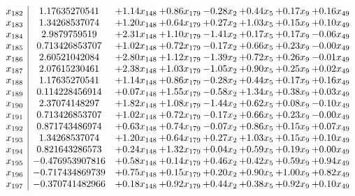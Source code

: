 \documentclass[8pt]{article}
\begin{document}
\[\begin{array}{c| c c@{\hskip 2pt} c@{\hskip 2pt} c@{\hskip 2pt} c@{\hskip 2pt} c@{\hskip 2pt} c@{\hskip 2pt} }
 x_{182}   &  1.17635270541 & +  1.14 x_{148} & +  0.86 x_{179} & -0.28 x_{2} & +  0.44 x_{5} & +  0.17 x_{9} & +  0.16 x_{49}\\
 x_{183}   &  1.34268537074 & +  1.20 x_{148} & +  0.64 x_{179} & +  0.27 x_{2} & +  1.03 x_{5} & +  0.15 x_{9} & +  0.10 x_{49}\\
 x_{184}   &  2.9879759519 & +  2.31 x_{148} & +  1.10 x_{179} & -1.41 x_{2} & +  0.17 x_{5} & +  0.17 x_{9} & -0.06 x_{49}\\
 x_{185}   &  0.713426853707 & +  1.02 x_{148} & +  0.72 x_{179} & -0.17 x_{2} & +  0.66 x_{5} & +  0.23 x_{9} & -0.00 x_{49}\\
 x_{186}   &  2.60521042084 & +  2.80 x_{148} & +  1.12 x_{179} & -1.39 x_{2} & +  0.72 x_{5} & +  0.26 x_{9} & -0.01 x_{49}\\
 x_{187}   &  2.07615230461 & +  2.38 x_{148} & +  1.03 x_{179} & -1.05 x_{2} & +  0.90 x_{5} & +  0.25 x_{9} & +  0.02 x_{49}\\
 x_{188}   &  1.17635270541 & +  1.14 x_{148} & +  0.86 x_{179} & -0.28 x_{2} & +  0.44 x_{5} & +  0.17 x_{9} & +  0.16 x_{49}\\
 x_{189}   &  0.114228456914 & +  0.07 x_{148} & +  1.55 x_{179} & -0.58 x_{2} & +  1.34 x_{5} & +  0.38 x_{9} & +  0.03 x_{49}\\
 x_{190}   &  2.37074148297 & +  1.82 x_{148} & +  1.08 x_{179} & -1.44 x_{2} & +  0.62 x_{5} & +  0.08 x_{9} & -0.10 x_{49}\\
 x_{191}   &  0.713426853707 & +  1.02 x_{148} & +  0.72 x_{179} & -0.17 x_{2} & +  0.66 x_{5} & +  0.23 x_{9} & -0.00 x_{49}\\
 x_{192}   &  0.871743486974 & +  0.63 x_{148} & +  0.74 x_{179} & -0.07 x_{2} & +  0.86 x_{5} & +  0.15 x_{9} & +  0.07 x_{49}\\
 x_{193}   &  1.34268537074 & +  1.20 x_{148} & +  0.64 x_{179} & +  0.27 x_{2} & +  1.03 x_{5} & +  0.15 x_{9} & +  0.10 x_{49}\\
 x_{194}   &  0.821643286573 & +  0.24 x_{148} & +  1.32 x_{179} & +  0.04 x_{2} & +  0.59 x_{5} & +  0.19 x_{9} & +  0.00 x_{49}\\
 x_{195}   &  -0.476953907816 & +  0.58 x_{148} & +  0.14 x_{179} & +  0.46 x_{2} & +  0.42 x_{5} & +  0.59 x_{9} & +  0.94 x_{49}\\
 x_{196}   &  -0.717434869739 & +  0.75 x_{148} & +  0.15 x_{179} & +  0.20 x_{2} & +  0.90 x_{5} & +  1.00 x_{9} & +  0.82 x_{49}\\
 x_{197}   &  -0.370741482966 & +  0.18 x_{148} & +  0.92 x_{179} & +  0.44 x_{2} & +  0.38 x_{5} & +  0.92 x_{9} & +  0.10 x_{49}\\

\end{array}\]
\end{document}
